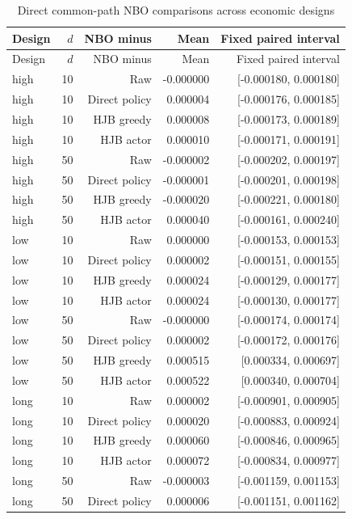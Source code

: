 \begingroup\small
\begin{longtable}{lrrrr}
\caption{Direct common-path NBO comparisons across economic designs}\label{tab:r16-robustness-comparisons}\\
\toprule
Design & $d$ & NBO minus & Mean & Fixed paired interval \\
\midrule
\endfirsthead
\toprule
Design & $d$ & NBO minus & Mean & Fixed paired interval \\
\midrule
\endhead
high & 10 & Raw & -0.000000 & [-0.000180, 0.000180] \\
high & 10 & Direct policy & 0.000004 & [-0.000176, 0.000185] \\
high & 10 & HJB greedy & 0.000008 & [-0.000173, 0.000189] \\
high & 10 & HJB actor & 0.000010 & [-0.000171, 0.000191] \\
high & 50 & Raw & -0.000002 & [-0.000202, 0.000197] \\
high & 50 & Direct policy & -0.000001 & [-0.000201, 0.000198] \\
high & 50 & HJB greedy & -0.000020 & [-0.000221, 0.000180] \\
high & 50 & HJB actor & 0.000040 & [-0.000161, 0.000240] \\
low & 10 & Raw & 0.000000 & [-0.000153, 0.000153] \\
low & 10 & Direct policy & 0.000002 & [-0.000151, 0.000155] \\
low & 10 & HJB greedy & 0.000024 & [-0.000129, 0.000177] \\
low & 10 & HJB actor & 0.000024 & [-0.000130, 0.000177] \\
low & 50 & Raw & -0.000000 & [-0.000174, 0.000174] \\
low & 50 & Direct policy & 0.000002 & [-0.000172, 0.000176] \\
low & 50 & HJB greedy & 0.000515 & [0.000334, 0.000697] \\
low & 50 & HJB actor & 0.000522 & [0.000340, 0.000704] \\
long & 10 & Raw & 0.000002 & [-0.000901, 0.000905] \\
long & 10 & Direct policy & 0.000020 & [-0.000883, 0.000924] \\
long & 10 & HJB greedy & 0.000060 & [-0.000846, 0.000965] \\
long & 10 & HJB actor & 0.000072 & [-0.000834, 0.000977] \\
long & 50 & Raw & -0.000003 & [-0.001159, 0.001153] \\
long & 50 & Direct policy & 0.000006 & [-0.001151, 0.001162] \\

\end{longtable}

